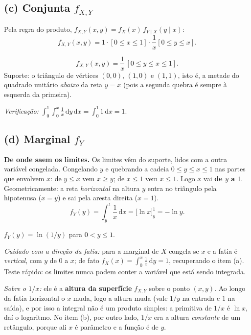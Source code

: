 \documentclass[11pt,a4paper]{article}
\newcommand{\Ind}[1]{\left[#1\right]}
\newcommand{\dd}{\,\mathrm{d}}
\begin{document}
\subsection*{(c) Conjunta $f_{X,Y}$}

Pela regra do produto, $f_{X,Y}(x,y)=f_X(x)\,f_{Y\mid X}(y\mid x)$:
\[
f_{X,Y}(x,y)=1\cdot\Ind{0\le x\le1}\cdot\frac1x\Ind{0\le y\le x}.
\]

\begin{resp}
\[
f_{X,Y}(x,y)=\frac1x\,\Ind{0\le y\le x\le 1}.
\]
Suporte: o triângulo de vértices $(0,0)$, $(1,0)$ e $(1,1)$, isto é, a metade do
quadrado unitário \emph{abaixo} da reta $y=x$ (pois a segunda quebra é sempre à
esquerda da primeira).
\end{resp}

\emph{Verificação:}
$\int_0^1\!\int_0^x \frac1x \dd y\dd x=\int_0^1 1 \dd x=1$. \checkmark

\subsection*{(d) Marginal $f_Y$}

\textbf{De onde saem os limites.} Os limites vêm do suporte, lidos com a outra
variável congelada. Congelando $y$ e quebrando a cadeia $0\le y\le x\le1$ nas
partes que envolvem $x$: de $y\le x$ vem $x\ge y$; de $x\le 1$ vem $x\le 1$. Logo
$x$ vai \textbf{de $y$ a $1$}. Geometricamente: a reta \emph{horizontal} na altura
$y$ entra no triângulo pela hipotenusa ($x=y$) e sai pela aresta direita ($x=1$).
\[
f_Y(y)=\int_{y}^{1}\frac1x\dd x=\Big[\ln x\Big]_{y}^{1}=-\ln y .
\]

\begin{resp}
$f_Y(y)=\ln(1/y)$ para $0<y\le1$.
\end{resp}

\emph{Cuidado com a direção da fatia:} para a marginal de $X$ congela-se $x$ e a
fatia é \emph{vertical}, com $y$ de $0$ a $x$; de fato
$f_X(x)=\int_0^x\frac1x\dd y=1$, recuperando o item (a). Teste rápido: os limites
nunca podem conter a variável que está sendo integrada.

\emph{Sobre o $1/x$:} ele é a \textbf{altura da superfície} $f_{X,Y}$ sobre o ponto
$(x,y)$. Ao longo da fatia horizontal o $x$ muda, logo a altura muda (vale $1/y$ na
entrada e $1$ na saída), e por isso a integral não é um produto simples: a primitiva
de $1/x$ é $\ln x$, daí o logaritmo. No item (b), por outro lado, $1/x$ era a altura
\emph{constante} de um retângulo, porque ali $x$ é parâmetro e a função é de $y$.
\end{document}
